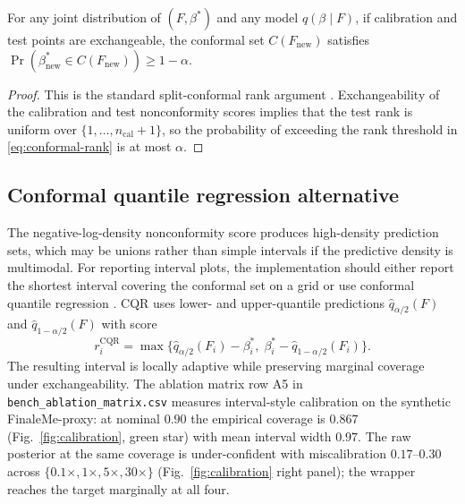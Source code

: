 \begin{proposition}
\label{prop:conformal}
For any joint distribution of $(F,\beta^*)$ and any model $q(\beta\mid F)$, if calibration and test points are exchangeable, the conformal set $C(F_{\mathrm{new}})$ satisfies $\Pr(\beta^*_{\mathrm{new}}\in C(F_{\mathrm{new}}))\ge 1-\alpha$.
\end{proposition}
\begin{proof}
This is the standard split-conformal rank argument \citep{vovk2005}. Exchangeability of the calibration and test nonconformity scores implies that the test rank is uniform over $\{1,\dots,n_{\mathrm{cal}}+1\}$, so the probability of exceeding the rank threshold in \eqref{eq:conformal-rank} is at most $\alpha$.
\end{proof}

\subsection{Conformal quantile regression alternative}
The negative-log-density nonconformity score produces high-density prediction sets, which may be unions rather than simple intervals if the predictive density is multimodal. For reporting interval plots, the implementation should either report the shortest interval covering the conformal set on a grid or use conformal quantile regression \citep{romano2019cqr}. CQR uses lower- and upper-quantile predictions $\hat q_{\alpha/2}(F)$ and $\hat q_{1-\alpha/2}(F)$ with score
\begin{equation}
r_i^{\mathrm{CQR}}=\max\big\{\hat q_{\alpha/2}(F_i)-\beta^*_i,\;\beta^*_i-\hat q_{1-\alpha/2}(F_i)\big\}.
\end{equation}
The resulting interval is locally adaptive while preserving marginal coverage under exchangeability. The ablation matrix row A5 in \texttt{bench\_ablation\_matrix.csv} measures interval-style calibration on the synthetic FinaleMe-proxy: at nominal $0.90$ the empirical coverage is $0.867$ (Fig.~\ref{fig:calibration}, green star) with mean interval width $0.97$. The raw posterior at the same coverage is under-confident with miscalibration $0.17$--$0.30$ across $\{0.1\times, 1\times, 5\times, 30\times\}$ (Fig.~\ref{fig:calibration} right panel); the wrapper reaches the target marginally at all four.

